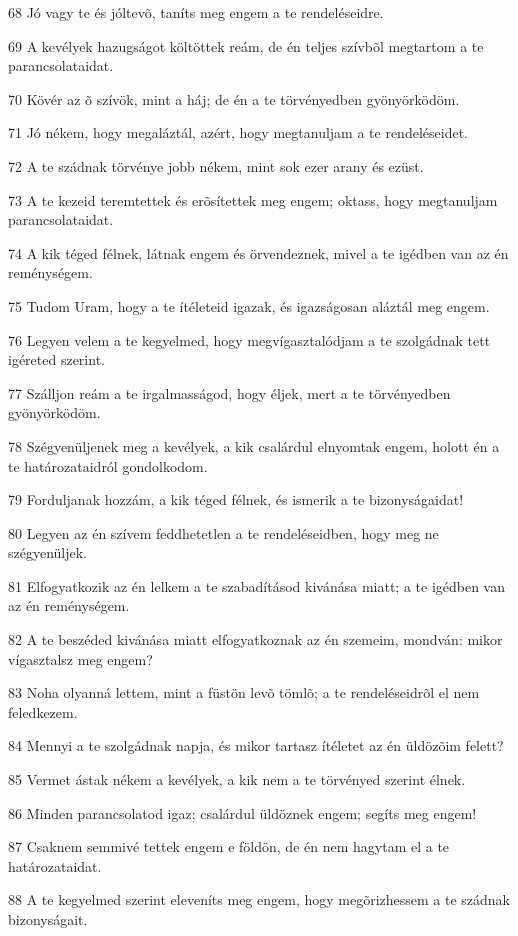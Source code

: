 \par 68 Jó vagy te és jóltevõ, taníts meg engem a te rendeléseidre.
\par 69 A kevélyek hazugságot költöttek reám, de én teljes szívbõl megtartom a te parancsolataidat.
\par 70 Kövér az õ szívök, mint a háj; de én a te törvényedben gyönyörködöm.
\par 71 Jó nékem, hogy megaláztál, azért, hogy megtanuljam a te rendeléseidet.
\par 72 A te szádnak törvénye jobb nékem, mint sok ezer arany és ezüst.
\par 73 A te kezeid teremtettek és erõsítettek meg engem; oktass, hogy megtanuljam parancsolataidat.
\par 74 A kik téged félnek, látnak engem és örvendeznek, mivel a te igédben van az én reménységem.
\par 75 Tudom Uram, hogy a te ítéleteid igazak, és igazságosan aláztál meg engem.
\par 76 Legyen velem a te kegyelmed, hogy megvígasztalódjam a te szolgádnak tett igéreted szerint.
\par 77 Szálljon reám a te irgalmasságod, hogy éljek, mert a te törvényedben gyönyörködöm.
\par 78 Szégyenüljenek meg a kevélyek, a kik csalárdul elnyomtak engem, holott én a te határozataidról gondolkodom.
\par 79 Forduljanak hozzám, a kik téged félnek, és ismerik a te bizonyságaidat!
\par 80 Legyen az én szívem feddhetetlen a te rendeléseidben, hogy meg ne szégyenüljek.
\par 81 Elfogyatkozik az én lelkem a te szabadításod kivánása miatt; a te igédben van az én reménységem.
\par 82 A te beszéded kivánása miatt elfogyatkoznak az én szemeim, mondván: mikor vígasztalsz meg engem?
\par 83 Noha olyanná lettem, mint a füstön levõ tömlõ; a te rendeléseidrõl el nem feledkezem.
\par 84 Mennyi a te szolgádnak napja, és mikor tartasz ítéletet az én üldözõim felett?
\par 85 Vermet ástak nékem a kevélyek, a kik nem a te törvényed szerint élnek.
\par 86 Minden parancsolatod igaz; csalárdul üldöznek engem; segíts meg engem!
\par 87 Csaknem semmivé tettek engem e földön, de én nem hagytam el a te határozataidat.
\par 88 A te kegyelmed szerint eleveníts meg engem, hogy megõrizhessem a te szádnak bizonyságait.
